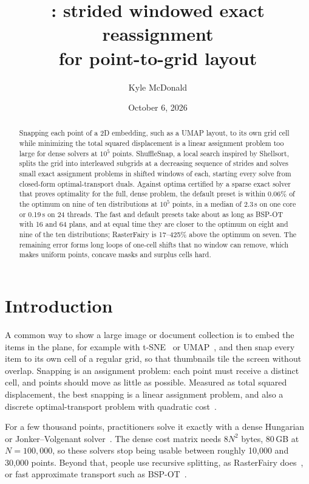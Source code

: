 \documentclass[11pt]{article}
\title{\ShuffleSnap: strided windowed exact reassignment\\for point-to-grid layout}
\author{Kyle McDonald}
\date{October 6, 2026}
\newcommand{\ShuffleSnap}{ShuffleSnap}
\begin{document}
\maketitle

\begin{abstract}
Snapping each point of a 2D embedding, such as a UMAP layout, to its own grid cell while
minimizing the total squared displacement is a linear assignment problem too large for dense
solvers at $10^5$ points. \ShuffleSnap, a local search inspired by Shellsort, splits the grid
into interleaved subgrids at a decreasing sequence of strides and solves small exact
assignment problems in shifted windows of each, starting every solve from closed-form
optimal-transport duals. Against optima certified by a sparse exact solver that proves
optimality for the full, dense problem, the default preset is within 0.06\% of the optimum on
nine of ten distributions at $10^5$ points, in a median of 2.3\,s on one core or 0.19\,s on
24 threads. The fast and default presets take about as long as BSP-OT with 16 and 64 plans,
and at equal time they are closer to the optimum on eight and nine of the ten distributions;
RasterFairy is 17--425\% above the optimum on seven. The remaining error forms long loops of
one-cell shifts that no window can remove, which makes uniform points, concave masks and
surplus cells hard.
\end{abstract}

\section{Introduction}

A common way to show a large image or document collection is to embed the items in the
plane, for example with t-SNE~\citep{vandermaaten2008tsne} or UMAP~\citep{mcinnes2018umap},
and then snap every item to its own cell of a regular grid, so that thumbnails tile the
screen without overlap. Snapping is an assignment problem: each point must receive a
distinct cell, and points should move as little as possible. Measured as total squared
displacement, the best snapping is a linear assignment problem, and also a discrete
optimal-transport problem with quadratic cost~\citep{peyre2019computational}.

For a few thousand points, practitioners solve it exactly with a dense Hungarian or
Jonker--Volgenant solver~\citep{kuhn1955hungarian,jonker1987shortest}. The dense cost
matrix needs $8N^2$ bytes, 80\,GB at $N=100{,}000$, so these solvers stop being usable
between roughly 10{,}000 and 30{,}000 points. Beyond that, people use recursive splitting,
as RasterFairy does~\citep{klingemann2015rasterfairy}, or fast approximate transport such as
BSP-OT~\citep{genest2025bspot}.
\end{document}
